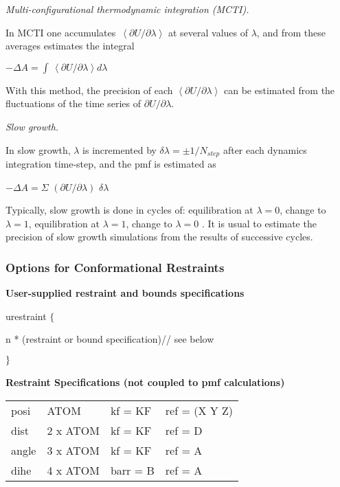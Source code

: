 {\em Multi-configurational thermodynamic integration (MCTI).}

In MCTI one accumulates $\,\left\langle \partial U/\partial \lambda
\right\rangle $ at several values of $\lambda $, and from these averages
estimates the integral

\qquad \qquad \qquad \qquad $-\Delta A=\int \,\left\langle \partial U/%
\partial \lambda \right\rangle d\lambda $

With this method, the precision of each $\left\langle \partial U/\partial %
\lambda \right\rangle $ can be estimated from the fluctuations of the time
series of $\partial U/\partial \lambda $.\bigskip 

{\em Slow growth.}

In slow growth, $\lambda $ is incremented by $\delta \lambda =\pm 1/N_{step}$
after each dynamics integration time-step, and the pmf is estimated as

\qquad \qquad \qquad \qquad $-\Delta A=\Sigma $ $\left( \partial U/\partial
\lambda \right) $ $\delta \lambda $

Typically, slow growth is done in cycles of: equilibration at $\lambda =0$,
change to $\lambda =1$, equilibration at $\lambda =1$, change to $\lambda =0$%
. It is usual to estimate the precision of slow growth simulations from the
results of successive cycles.\pagebreak 

\subsubsection{Options for Conformational Restraints}

{\bf User-supplied restraint and bounds specifications}

\qquad \qquad urestraint $\{$

\qquad \qquad \quad n * (restraint or bound specification)\qquad \qquad //
see below

\qquad \qquad $\}\medskip $

{\bf Restraint Specifications (not coupled to pmf calculations)}

\qquad \qquad 
\begin{tabular}{llll}
posi & ATOM & kf = KF & ref = (X Y Z) \\ 
dist & 2 x ATOM & kf = KF & ref = D \\ 
angle & 3 x ATOM & kf = KF & ref = A \\ 
dihe & 4 x ATOM & barr = B & ref = A
\end{tabular}
\bigskip 

